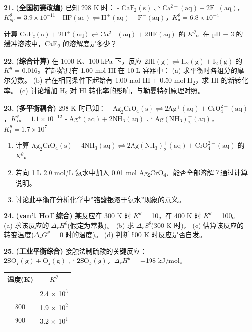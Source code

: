 \textbf{21.} \textbf{(全国初赛改编)} 已知 298 K 时：
- \(\mathrm{CaF_2(s) \rightleftharpoons Ca^{2+}(aq) + 2F^-(aq)}\)，\(K_{sp}^\theta = 3.9 \times 10^{-11}\)
- \(\mathrm{HF(aq) \rightleftharpoons H^+(aq) + F^-(aq)}\)，\(K_{\mathrm a}^\theta = 6.8 \times 10^{-4}\)

计算 \(\mathrm{CaF_2(s) + 2H^+(aq) \rightleftharpoons Ca^{2+}(aq) + 2HF(aq)}\) 的 \(K^\theta\)。在 pH = 3 的缓冲溶液中，CaF\textsubscript{2} 的溶解度是多少？

\textbf{22.} \textbf{(综合计算)} 在 1000 K、100 kPa 下，反应 \(\mathrm{2HI(g) \rightleftharpoons H_2(g) + I_2(g)}\) 的 \(K^\theta\) = 0.016。若起始只有 1.00 mol HI 在 10 L 容器中：
(a) 求平衡时各组分的摩尔分数。
(b) 若在相同条件下起始有 1.00 mol HI + 0.50 mol H\textsubscript{2}，求 HI 的新转化率。
(c) 讨论增加 H\textsubscript{2} 对 HI 转化率的影响，与勒夏特列原理对照。

\textbf{23.} \textbf{(多平衡耦合)} 298 K 时已知：
- \(\mathrm{Ag_2CrO_4(s) \rightleftharpoons 2Ag^+(aq) + CrO_4^{2-}(aq)}\)，\(K_{sp}^\theta = 1.1 \times 10^{-12}\)
- \(\mathrm{Ag^+(aq) + 2NH_3(aq) \rightleftharpoons Ag(NH_3)_2^+(aq)}\)，\(K_{\mathrm f}^\theta = 1.7 \times 10^7\)

\begin{enumerate}
\def\labelenumi{(\alph{enumi})}
\tightlist
\item
  计算 \(\mathrm{Ag_2CrO_4(s) + 4NH_3(aq) \rightleftharpoons 2Ag(NH_3)_2^+(aq) + CrO_4^{2-}(aq)}\) 的 \(K^\theta\)。
\item
  若向 1 L 2.0 mol/L 氨水中加入 0.01 mol Ag\textsubscript{2}CrO\textsubscript{4}，能否全部溶解？通过计算说明。
\item
  讨论此平衡在分析化学中''铬酸银溶于氨水''现象的意义。
\end{enumerate}

\textbf{24.} \textbf{(van't Hoff 综合)} 某反应在 300 K 时 \(K^\theta\) = 10，在 400 K 时 \(K^\theta\) = 100。
(a) 求该反应的 \(\Delta_r H^\theta\)(假定为常数)。
(b) 求 \(\Delta_r S^\theta\)(300 K 时)。
(c) 估算该反应的转变温度(\(\Delta_r G^\theta\) = 0 时的温度)。
(d) 判断 500 K 时反应是否自发。

\textbf{25.} \textbf{(工业平衡综合)} 接触法制硫酸的关键反应：\(\mathrm{2SO_2(g) + O_2(g) \rightleftharpoons 2SO_3(g)}\)，\(\Delta_r H^\theta\) = −198 kJ/mol。

{\def\LTcaptype{none} %
\begin{longtable}[]{@{}cc@{}}
\toprule\noalign{}
温度(K) & \(K^\theta\) \\
\midrule\noalign{}
\endhead
\bottomrule\noalign{}
\endlastfoot
700 & 2.4 × 10\textsuperscript{3} \\
800 & 1.9 × 10\textsuperscript{2} \\
900 & 3.2 × 10\textsuperscript{1} \\
\end{longtable}
}

